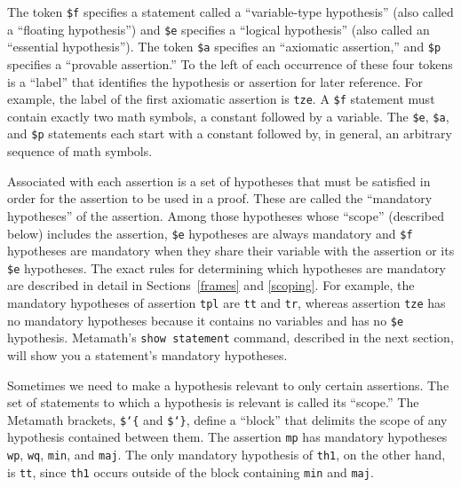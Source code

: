 The token \texttt{\$f} specifies a
statement called a ``variable-type hypothesis'' (also called a
``floating hypothesis'') and \texttt{\$e}
specifies a ``logical hypothesis'' (also called an ``essential
hypothesis''). The token
\texttt{\$a} specifies an ``axiomatic
assertion,'' and
\texttt{\$p} specifies a ``provable
assertion.'' To the left of each occurrence of
these four tokens is a ``label'' that identifies the
hypothesis or assertion for later reference.  For example, the label of
the first axiomatic assertion is \texttt{tze}.  A \texttt{\$f} statement
must contain exactly two math symbols, a constant followed by a
variable.  The \texttt{\$e}, \texttt{\$a}, and \texttt{\$p} statements
each start with a constant followed by, in general, an arbitrary
sequence of math symbols.

Associated with each assertion is a set of hypotheses
that must be satisfied in order for the assertion to be used in a proof.
These are called the ``mandatory hypotheses'' of the assertion.  Among those hypotheses whose ``scope''
(described below) includes the assertion, \texttt{\$e} hypotheses are
always mandatory and \texttt{\$f}
hypotheses are mandatory when they share their variable with the
assertion or its \texttt{\$e} hypotheses.  The exact rules for
determining which hypotheses are mandatory are described in detail in
Sections~\ref{frames} and \ref{scoping}.  For example, the mandatory
hypotheses of assertion \texttt{tpl} are \texttt{tt} and \texttt{tr},
whereas assertion \texttt{tze} has no mandatory hypotheses because it
contains no variables and has no \texttt{\$e} hypothesis.  Metamath's \texttt{show statement}
command, described in the next
section, will show you a statement's mandatory hypotheses.

Sometimes we need to make a hypothesis relevant to only certain
assertions.  The set of statements to which a hypothesis is relevant is
called its ``scope.''  The Metamath brackets,
\texttt{\$\char`\{} and \texttt{\$\char`\}}, define a ``block'' that
delimits the scope of any hypothesis contained between them.  The
assertion \texttt{mp} has mandatory hypotheses \texttt{wp}, \texttt{wq},
\texttt{min}, and \texttt{maj}.  The only mandatory hypothesis of
\texttt{th1}, on the other hand, is \texttt{tt}, since \texttt{th1}
occurs outside of the block containing \texttt{min} and \texttt{maj}.

